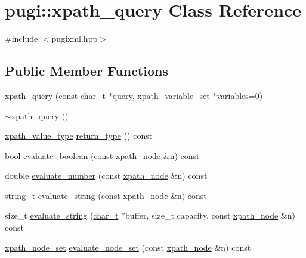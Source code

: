 \hypertarget{classpugi_1_1xpath__query}{\section{pugi\-:\-:xpath\-\_\-query Class Reference}
\label{classpugi_1_1xpath__query}
}


{\ttfamily \#include $<$pugixml.\-hpp$>$}

\subsection*{Public Member Functions}
\begin{DoxyCompactItemize}
\item 
\hyperlink{classpugi_1_1xpath__query_a6ff5db850994f40154a7373b461c61d0}{xpath\-\_\-query} (const \hyperlink{namespacepugi_aef5a7a62cba0507542220ea15afe39df}{char\-\_\-t} $\ast$query, \hyperlink{classpugi_1_1xpath__variable__set}{xpath\-\_\-variable\-\_\-set} $\ast$variables=0)
\item 
\hyperlink{classpugi_1_1xpath__query_a430b82947a8a74f30a757940530544cf}{$\sim$xpath\-\_\-query} ()
\item 
\hyperlink{namespacepugi_ae3820874caf240e9f311bfd2790a84d6}{xpath\-\_\-value\-\_\-type} \hyperlink{classpugi_1_1xpath__query_a63416a6b472bd8641facac09f3deb997}{return\-\_\-type} () const 
\item 
bool \hyperlink{classpugi_1_1xpath__query_a9d7c21acdc934a0b969f88f8ae3df21e}{evaluate\-\_\-boolean} (const \hyperlink{classpugi_1_1xpath__node}{xpath\-\_\-node} \&n) const 
\item 
double \hyperlink{classpugi_1_1xpath__query_a002919f6c360cc382ce050af37039fd9}{evaluate\-\_\-number} (const \hyperlink{classpugi_1_1xpath__node}{xpath\-\_\-node} \&n) const 
\item 
\hyperlink{namespacepugi_a053b39a84c8bb031ff3973d1954a876c}{string\-\_\-t} \hyperlink{classpugi_1_1xpath__query_ad628e189fc4924d67acfbaeeb0f1f21f}{evaluate\-\_\-string} (const \hyperlink{classpugi_1_1xpath__node}{xpath\-\_\-node} \&n) const 
\item 
size\-\_\-t \hyperlink{classpugi_1_1xpath__query_aa20b2392867d091115cdcd9194bf8ccf}{evaluate\-\_\-string} (\hyperlink{namespacepugi_aef5a7a62cba0507542220ea15afe39df}{char\-\_\-t} $\ast$buffer, size\-\_\-t capacity, const \hyperlink{classpugi_1_1xpath__node}{xpath\-\_\-node} \&n) const 
\item 
\hyperlink{classpugi_1_1xpath__node__set}{xpath\-\_\-node\-\_\-set} \hyperlink{classpugi_1_1xpath__query_ad5e3826c813e90c30db42f1778bc8adc}{evaluate\-\_\-node\-\_\-set} (const \hyperlink{classpugi_1_1xpath__node}{xpath\-\_\-node} \&n) const 

\end{DoxyCompactItemize}
